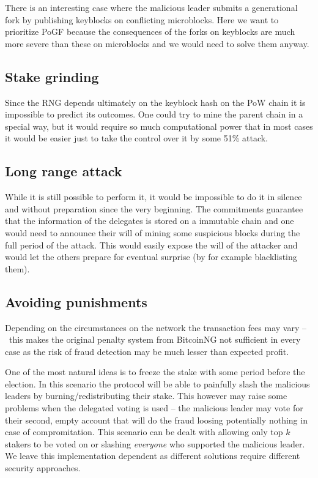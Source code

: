There is an interesting case where the malicious leader submits a generational
fork by publishing keyblocks on conflicting microblocks.
Here we want to prioritize PoGF because the consequences of the forks on
keyblocks are much more severe than these on microblocks and we would need to
solve them anyway.

\subsection{Stake grinding}

Since the RNG depends ultimately on the keyblock hash on the PoW chain it is
impossible to predict its outcomes. One could try to mine the parent chain
in a special way, but it would require so much computational power that in
most cases it would be easier just to take the control over it by some 51\%
attack.

\subsection{Long range attack}
While it is still possible to perform it, it would be impossible to do it in
silence and without preparation since the very beginning. The commitments
guarantee that the information of the delegates is stored on a immutable chain
and one would need to announce their will of mining some suspicious blocks during
the full period of the attack. This would easily expose the will of the attacker
and would let the others prepare for eventual surprise (by for example
blacklisting them).

\subsection{Avoiding punishments}
Depending on the circumstances on the network the transaction fees may vary
– this makes the original penalty system from BitcoinNG not sufficient in every
case as the risk of fraud detection may be much lesser than expected profit.

One of the most natural ideas is to freeze the stake with some period before the
election. In this scenario the protocol will be able to painfully slash the
malicious leaders by burning/redistributing their stake. This however may raise
some problems when the delegated voting is used – the malicious leader may vote
for their second, empty account that will do the fraud loosing potentially
nothing in case of compromitation. This scenario can be dealt with allowing only
top $k$ stakers to be voted on or slashing \textit{everyone} who supported the
malicious leader. We leave this implementation dependent as different solutions
require different security approaches.